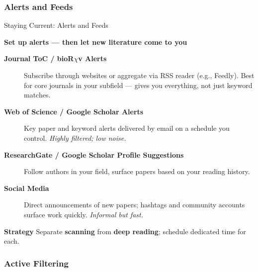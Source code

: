 \documentclass{beamer}
\begin{document}
\subsubsection{Alerts and Feeds}

\begin{frame}{Staying Current: Alerts and Feeds}

  \footnotesize
  \textbf{Set up alerts --- then let new literature come to you}

  \smallskip
  \begin{description}

    \item[\textbf{Journal ToC / bioR$\chi$v Alerts}]
      Subscribe through websites or aggregate
      via RSS reader (e.g., Feedly). Best for core journals in
      your subfield --- gives you everything, not just keyword matches.

    \item[\textbf{Web of Science / Google Scholar Alerts}]
      Key paper and keyword alerts delivered by email on a schedule
      you control. \textit{Highly filtered; low noise.}

    \item[\textbf{ResearchGate / Google Scholar Profile Suggestions}]
      Follow authors in your field, surface papers
      based on your reading history.

    \item[\textbf{Social Media}]
      Direct announcements of new papers; hashtags
      and community accounts surface work quickly.
      \textit{Informal but fast.}
  \end{description}

  \medskip
  \begin{block}{\textbf{Strategy}}
    Separate \textbf{scanning} from \textbf{deep reading}; schedule dedicated time for each.
  \end{block}

\end{frame}


\subsubsection{Active Filtering}
\end{document}

